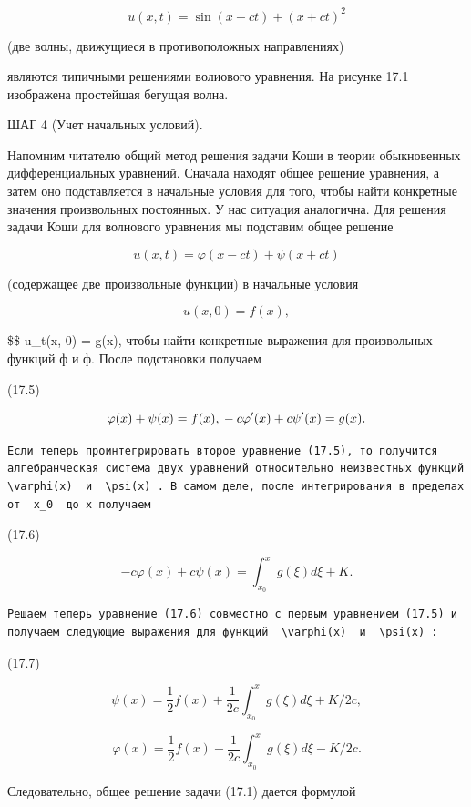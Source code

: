 \documentclass[
  ukrainian,
]{article}
\begin{document}
\[
u(x, t) = \sin(x - ct) + (x + ct)^2
\]

(две волны, движущиеся в противоположных направлениях)

являются типичными решениями волиового уравнения. На рисунке 17.1
изображена простейшая бегущая волна.

ШАГ 4 (Учет начальных условий).

Напомним читателю общий метод решения задачи Коши в теории обыкновенных
дифференциальных уравнений. Сначала находят общее решение уравнения, а
затем оно подставляется в начальные условия для того, чтобы найти
конкретные значения произвольных постоянных. У нас ситуация аналогична.
Для решения задачи Коши для волнового уравнения мы подставим общее
решение

\[
u(x, t) = \varphi(x - ct) + \psi(x + ct)
\]

(содержащее две произвольные функции) в начальные условия

\[
u(x, 0) = f(x),
\]

\$\$ u\_t(x, 0) = g(x), чтобы найти конкретные выражения для
произвольных функций ф и ф. После подстановки получаем

(17.5)

\[
\varphi(x) + \psi(x) = f(x), \\ -c\varphi'(x) + c\psi'(x) = g(x).
\]

\begin{verbatim}
Если теперь проинтегрировать второе уравнение (17.5), то получится алгебранческая система двух уравнений относительно неизвестных функций  \varphi(x)  и  \psi(x) . В самом деле, после интегрирования в пределах от  x_0  до x получаем
\end{verbatim}

(17.6)

\[
-c\varphi(x) + c\psi(x) = \int_{x_0}^{x} g(\xi) d\xi + K.
\]

\begin{verbatim}
Решаем теперь уравнение (17.6) совместно с первым уравнением (17.5) и получаем следующие выражения для функций  \varphi(x)  и  \psi(x) :
\end{verbatim}

(17.7)

\[
\psi(x) = \frac{1}{2} f(x) + \frac{1}{2c} \int_{x_0}^{x} g(\xi) d\xi + K/2c,
\]

\[
\varphi(x) = \frac{1}{2} f(x) - \frac{1}{2c} \int_{x_0}^{x} g(\xi) d\xi - K/2c.
\]

Следовательно, общее решение задачи (17.1) дается формулой
\end{document}
